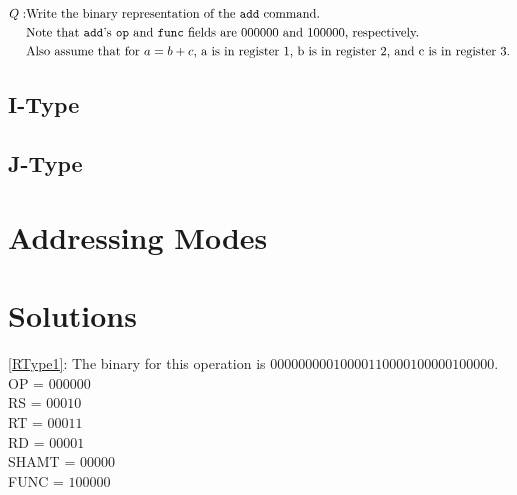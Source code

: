 \documentclass{article}
\begin{document}
\begin{equation}\label{RType1}
\begin{aligned}
    Q: & \text{Write the binary representation of the \texttt{add} command.}\\
    & \text{Note that \texttt{add}'s \texttt{op} and \texttt{func} fields are 000000 and 100000, respectively.}\\
    & \text{Also assume that for } a = b + c \text{, a is in register 1, b is in register 2, and c is in register 3.}
\end{aligned}
\end{equation}

\subsection{I-Type}\label{IType}

\subsection{J-Type}\label{JType}

\section{Addressing Modes}\label{Addressing}

\section{Solutions}

\ref{RType1}: The binary for this operation is $000000 00010 00011 00001 00000 100000$. \\ OP = $000000$ \\ RS = $00010$ \\ RT = $00011$ \\ RD = $00001$ \\ SHAMT = $00000$ \\ FUNC = $100000$


\printindex
\end{document}
